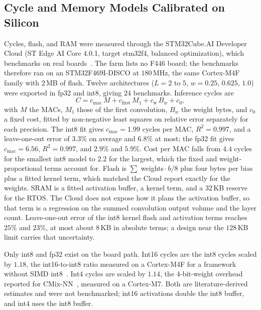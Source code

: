 \subsection{Cycle and Memory Models Calibrated on Silicon}
\label{sec:calibration}
Cycles, flash, and RAM were measured through the STM32Cube.AI Developer
Cloud (ST Edge AI Core 4.0.1, target stm32f4, balanced optimization), which
benchmarks on real boards~\cite{berta2024cloud}. The farm lists no F446
board; the benchmarks therefore ran on an STM32F469I-DISCO at $180$\,MHz, the same
Cortex-M4F family with $2$\,MB of flash. Twelve architectures
($L=2$ to $5$, $w=0.25$, $0.625$, $1.0$) were exported in fp32 and int8, giving
$24$ benchmarks. Inference cycles are
\begin{equation}
C=c_{\mathrm{mac}}\,M+c_{\mathrm{first}}\,M_1+c_{\mathrm{w}}\,B_w+c_0,
\label{eq:cycles}
\end{equation}
with $M$ the MACs, $M_1$ those of the first convolution, $B_w$ the weight
bytes, and $c_0$ a fixed cost, fitted by non-negative least squares on
relative error separately for each precision. The int8 fit gives
$c_{\mathrm{mac}}=1.99$ cycles per MAC, $R^2=0.997$, and a leave-one-out
error of $3.3\%$ on average and $6.8\%$ at most; the fp32 fit gives
$c_{\mathrm{mac}}=6.56$, $R^2=0.997$, and $2.9\%$ and $5.9\%$. Cost per MAC
falls from $4.4$ cycles for the smallest int8 model to $2.2$ for the largest,
which the fixed and weight-proportional terms account for. Flash is $\sum$ weights${}\cdot b/8$
plus four bytes per bias plus a fitted kernel term, which matched the Cloud
report exactly for the weights. SRAM is a fitted activation buffer, a kernel
term, and a $32$\,KB reserve for the RTOS. The Cloud does not expose how it
plans the activation buffer, so that term is a regression on the summed
convolution output volume and the layer count. Leave-one-out error of the
int8 kernel flash and activation terms reaches $25\%$ and $23\%$, at most
about $8$\,KB in absolute terms; a design near the $128$\,KB limit carries
that uncertainty.



Only int8 and fp32 exist on the board path. Int16 cycles are the int8 cycles
scaled by $1.18$, the int16-to-int8 ratio measured on a Cortex-M4F for a
framework without SIMD int8~\cite{novac2021mcu}. Int4 cycles are scaled by
$1.14$, the 4-bit-weight overhead reported for CMix-NN~\cite{capotondi2020cmix}, measured
on a Cortex-M7. Both are literature-derived estimates and were not benchmarked;
int16 activations double the int8 buffer, and int4 uses the int8 buffer.

